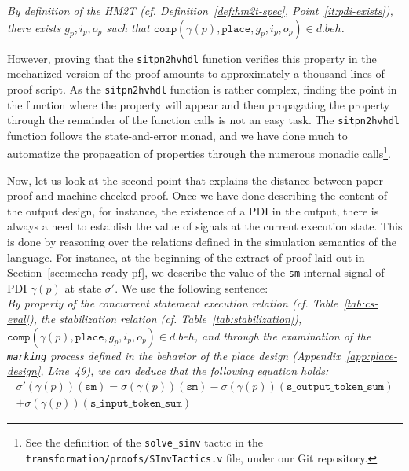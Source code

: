 \documentclass[pdflatex,sn-mathphys]{sn-jnl}%
\theoremstyle{thmstyleone}%
\theoremstyle{thmstyletwo}%
\theoremstyle{thmstylethree}%
\begin{document}
\textit{By definition of the HM2T (cf. Definition~\ref{def:hm2t-spec},
  Point~\ref{it:pdi-exists}), there exists $g_p,i_p,o_p$ such that
  $\mathtt{comp}(\gamma(p),\mathtt{place},g_p,i_p,o_p)\in{}d.beh$.}

\bigskip

However, proving that the \texttt{sitpn2hvhdl} function verifies this
property in the mechanized version of the proof amounts to
approximately a thousand lines of proof script. As the
\texttt{sitpn2hvhdl} function is rather complex, finding the point in
the function where the property will appear and then propagating the
property through the remainder of the function calls is not an easy
task.  The \texttt{sitpn2hvhdl} function follows the state-and-error
monad, and we have done much to automatize the propagation of
properties through the numerous monadic calls\footnote{See the
  definition of the \texttt{solve\_sinv} tactic in the
  \texttt{transformation/proofs/SInvTactics.v} file, under our
  \textsf{Git} repository.}.

Now, let us look at the second point that explains the distance
between paper proof and machine-checked proof. Once we have done
describing the content of the output design, for instance, the
existence of a PDI in the output, there is always a need to establish
the value of signals at the current execution state. This is done by
reasoning over the relations defined in the simulation semantics of
the \hvhdl{} language. For instance, at the beginning of the extract
of proof laid out in Section~\ref{sec:mecha-ready-pf}, we describe the
value of the \texttt{sm} internal signal of PDI $\gamma(p)$ at state
$\sigma'$. We use the following sentence: \\

\textit{By property of the \hvhdl{} concurrent statement execution
  relation (cf. Table~\ref{tab:cs-eval}), the stabilization relation
  (cf. Table~\ref{tab:stabilization}),
  $\mathtt{comp}(\gamma(p),\mathtt{place},g_p,i_p,o_p)\in{}d.beh$, and
  through the examination of the \texttt{marking} process defined in
  the behavior of the place design (Appendix~\ref{app:place-design},
  Line~49), we can deduce that the following equation holds:}
\begin{equation*}
  \begin{split}
    \sigma'(\gamma(p))(\texttt{sm})=\sigma(\gamma(p))(\texttt{sm})-\sigma(\gamma(p))(\texttt{s\_output\_token\_sum})\\
    +\sigma(\gamma(p))(\texttt{s\_input\_token\_sum})
  \end{split}
\end{equation*}
\end{document}
